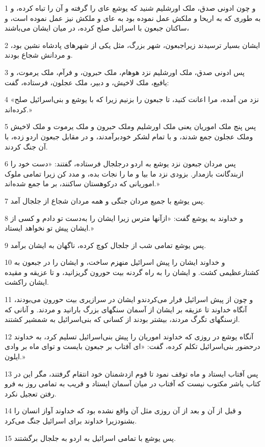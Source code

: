 \par 1 و چون ادونی صدق، ملک اورشلیم شنید که یوشع عای را گرفته و آن را تباه کرده، و به طوری که به اریحا و ملکش عمل نموده بود به عای و ملکش نیز عمل نموده است، و ساکنان جبعون با اسرائیل صلح کرده، در میان ایشان می‌باشند،
\par 2 ایشان بسیار ترسیدند زیراجبعون، شهر بزرگ، مثل یکی از شهرهای پادشاه نشین بود، و مردانش شجاع بودند.
\par 3 پس ادونی صدق، ملک اورشلیم نزد هوهام، ملک حبرون، و فرآم، ملک یرموت، و یافیع، ملک لاخیش، و دبیر، ملک عجلون، فرستاده، گفت:
\par 4 «نزد من آمده، مرا اعانت کنید، تا جبعون را بزنیم زیرا که با یوشع و بنی‌اسرائیل صلح کرده‌اند.»
\par 5 پس پنج ملک اموریان یعنی ملک اورشلیم وملک حبرون و ملک یرموت و ملک لاخیش وملک عجلون جمع شدند، و با تمام لشکر خودبرآمدند، و در مقابل جبعون اردو زده، با آن جنگ کردند.
\par 6 پس مردان جبعون نزد یوشع به اردو درجلجال فرستاده، گفتند: «دست خود را ازبندگانت بازمدار. بزودی نزد ما بیا و ما را نجات بده، و مدد کن زیرا تمامی ملوک اموریانی که درکوهستان ساکنند، بر ما جمع شده‌اند.»
\par 7 پس یوشع با جمیع مردان جنگی و همه مردان شجاع از جلجال آمد.
\par 8 و خداوند به یوشع گفت: «ازآنها مترس زیرا ایشان را به‌دست تو دادم و کسی از ایشان پیش تو نخواهد ایستاد.»
\par 9 پس یوشع تمامی شب از جلجال کوچ کرده، ناگهان به ایشان برآمد.
\par 10 و خداوند ایشان را پیش اسرائیل منهزم ساخت، و ایشان را در جبعون به کشتارعظیمی کشت. و ایشان را به راه گردنه بیت حورون گریزانید، و تا عزیقه و مقیده ایشان راکشت.
\par 11 و چون از پیش اسرائیل فرار می‌کردندو ایشان در سرازیری بیت حورون می‌بودند، آنگاه خداوند تا عزیقه بر ایشان از آسمان سنگهای بزرگ بارانید و مردند. و آنانی که ازسنگهای تگرگ مردند، بیشتر بودند از کسانی که بنی‌اسرائیل به شمشیر کشتند.
\par 12 آنگاه یوشع در روزی که خداوند اموریان را پیش بنی‌اسرائیل تسلیم کرد، به خداوند درحضور بنی‌اسرائیل تکلم کرده، گفت: «ای آفتاب بر جبعون بایست و تو‌ای ماه بر وادی ایلون.»
\par 13 پس آفتاب ایستاد و ماه توقف نمود تا قوم ازدشمنان خود انتقام گرفتند، مگر این در کتاب یاشر مکتوب نیست که آفتاب در میان آسمان ایستاد و قریب به تمامی روز به فرو رفتن تعجیل نکرد.
\par 14 و قبل از آن و بعد از آن روزی مثل آن واقع نشده بود که خداوند آواز انسان را بشنودزیرا خداوند برای اسرائیل جنگ می‌کرد.
\par 15 پس یوشع با تمامی اسرائیل به اردو به جلجال برگشتند.
